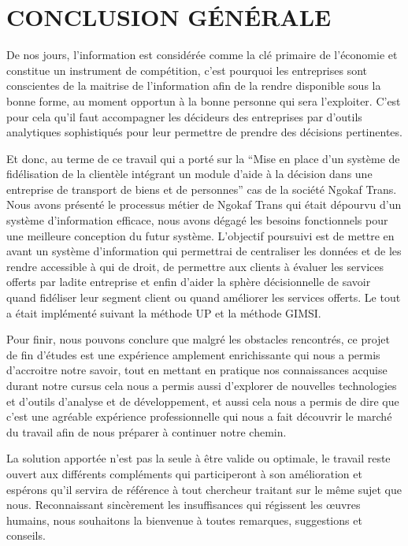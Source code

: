 \chapter*{CONCLUSION GÉNÉRALE}
De nos jours, l’information est considérée comme la clé primaire
de l’économie et constitue un instrument de compétition,
c’est pourquoi les entreprises sont conscientes de la maitrise 
de l’information afin de la rendre disponible sous
la bonne forme, au moment opportun à la bonne personne qui sera
l’exploiter. C’est pour cela qu’il faut accompagner les décideurs des 
entreprises par d’outils analytiques sophistiqués pour leur
permettre de prendre des décisions pertinentes.
\par
Et donc, au terme de ce travail qui a porté sur
la \enquote{Mise en place d’un système de fidélisation de la clientèle
intégrant un module d’aide à la décision dans une entreprise
de transport de biens et de personnes} cas de la société Ngokaf Trans. 
Nous avons présenté le processus métier de Ngokaf Trans
qui était dépourvu d'un système d'information efficace, nous avons
dégagé les besoins fonctionnels pour une meilleure conception du futur système.
L’objectif poursuivi est de mettre en avant un système d'information qui
permettrai de centraliser les données et de les rendre accessible à qui de droit, 
de permettre aux clients à évaluer les services offerts par ladite entreprise et enfin
d'aider la sphère décisionnelle de savoir quand fidéliser leur segment client ou 
quand améliorer les services offerts. Le tout a était implémenté suivant la
méthode UP et la méthode GIMSI.
\par
Pour finir, nous pouvons conclure que malgré les obstacles rencontrés,
ce projet de fin d’études est une expérience amplement enrichissante
qui nous a permis d’accroitre notre savoir, tout en mettant en pratique
nos connaissances acquise durant notre cursus cela nous a permis aussi 
d’explorer de nouvelles technologies et d’outils d’analyse et de
développement, et aussi cela nous a permis de dire que c’est une
agréable expérience professionnelle qui nous a fait découvrir
le marché du travail afin de nous préparer à continuer notre chemin.
\par
La solution apportée n’est pas la seule à être valide ou optimale,
le travail reste ouvert aux différents compléments qui participeront
à son amélioration et espérons qu’il servira
de référence à tout chercheur traitant sur le même sujet que nous.
Reconnaissant sincèrement les
insuffisances qui régissent les œuvres humains, nous souhaitons la
bienvenue à toutes remarques, suggestions et conseils.

